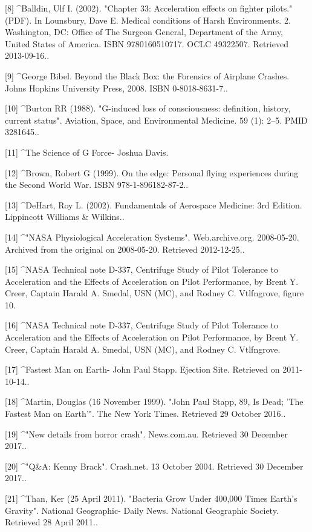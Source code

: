 [8]
^Balldin, Ulf I. (2002). "Chapter 33: Acceleration effects on fighter pilots." (PDF). In Lounsbury, Dave E. Medical conditions of Harsh Environments. 2. Washington, DC: Office of The Surgeon General, Department of the Army, United States of America. ISBN 9780160510717. OCLC 49322507. Retrieved 2013-09-16..

[9]
^George Bibel. Beyond the Black Box: the Forensics of Airplane Crashes. Johns Hopkins University Press, 2008. ISBN 0-8018-8631-7..

[10]
^Burton RR (1988). "G-induced loss of consciousness: definition, history, current status". Aviation, Space, and Environmental Medicine. 59 (1): 2–5. PMID 3281645..

[11]
^The Science of G Force- Joshua Davis.

[12]
^Brown, Robert G (1999). On the edge: Personal flying experiences during the Second World War. ISBN 978-1-896182-87-2..

[13]
^DeHart, Roy L. (2002). Fundamentals of Aerospace Medicine: 3rd Edition. Lippincott Williams & Wilkins..

[14]
^"NASA Physiological Acceleration Systems". Web.archive.org. 2008-05-20. Archived from the original on 2008-05-20. Retrieved 2012-12-25..

[15]
^NASA Technical note D-337, Centrifuge Study of Pilot Tolerance to Acceleration and the Effects of Acceleration on Pilot Performance, by Brent Y. Creer, Captain Harald A. Smedal, USN (MC), and Rodney C. Vtlfngrove, figure 10.

[16]
^NASA Technical note D-337, Centrifuge Study of Pilot Tolerance to Acceleration and the Effects of Acceleration on Pilot Performance, by Brent Y. Creer, Captain Harald A. Smedal, USN (MC), and Rodney C. Vtlfngrove.

[17]
^Fastest Man on Earth- John Paul Stapp. Ejection Site. Retrieved on 2011-10-14..

[18]
^Martin, Douglas (16 November 1999). "John Paul Stapp, 89, Is Dead; 'The Fastest Man on Earth'". The New York Times. Retrieved 29 October 2016..

[19]
^"New details from horror crash". News.com.au. Retrieved 30 December 2017..

[20]
^"Q&A: Kenny Brack". Crash.net. 13 October 2004. Retrieved 30 December 2017..

[21]
^Than, Ker (25 April 2011). "Bacteria Grow Under 400,000 Times Earth's Gravity". National Geographic- Daily News. National Geographic Society. Retrieved 28 April 2011..

